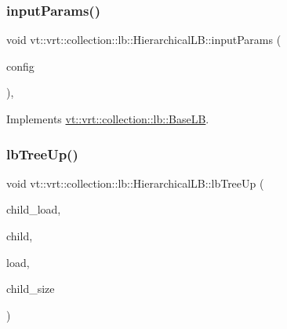 \subsubsection{\texorpdfstring{input\+Params()}{inputParams()}}
{\footnotesize\ttfamily void vt\+::vrt\+::collection\+::lb\+::\+Hierarchical\+L\+B\+::input\+Params (\begin{DoxyParamCaption}\item[{\hyperlink{structvt_1_1vrt_1_1collection_1_1balance_1_1_config_entry}{balance\+::\+Config\+Entry} $\ast$}]{config }\end{DoxyParamCaption})\hspace{0.3cm}{\ttfamily [override]}, {\ttfamily [virtual]}}



Implements \hyperlink{structvt_1_1vrt_1_1collection_1_1lb_1_1_base_l_b_acf56a0cc29f5e00c0dccf2003baa2f43}{vt\+::vrt\+::collection\+::lb\+::\+Base\+LB}.

\mbox{\label{structvt_1_1vrt_1_1collection_1_1lb_1_1_hierarchical_l_b_a6f030d878c37c7dbca04f71304319930}} 
\subsubsection{\texorpdfstring{lb\+Tree\+Up()}{lbTreeUp()}}
{\footnotesize\ttfamily void vt\+::vrt\+::collection\+::lb\+::\+Hierarchical\+L\+B\+::lb\+Tree\+Up (\begin{DoxyParamCaption}\item[{\hyperlink{structvt_1_1vrt_1_1collection_1_1lb_1_1_base_l_b_a215e22b9f12678303f49615ae3be05cc}{Load\+Type} const}]{child\+\_\+load,  }\item[{\hyperlink{namespacevt_a866da9d0efc19c0a1ce79e9e492f47e2}{Node\+Type} const}]{child,  }\item[{\hyperlink{structvt_1_1vrt_1_1collection_1_1lb_1_1_load_sampler_base_l_b_a8d939a849ec0d6371c1c4d441ffb9b94}{Obj\+Sample\+Type}}]{load,  }\item[{\hyperlink{namespacevt_a866da9d0efc19c0a1ce79e9e492f47e2}{Node\+Type} const}]{child\+\_\+size }\end{DoxyParamCaption})\hspace{0.3cm}{\ttfamily [private]}}

